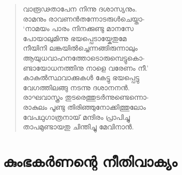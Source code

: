 \begin{verse}
വാരൂഢതാപേന നിന്നു ദശാസ്യനും.\\
രാമനും രാവണന്‍തന്നോടരുള്‍ചെയ്താ-\\
‘നാമയം പാരം നിനക്കുണ്ടു മാനസേ\\
പോയാലുമിന്നു ഭയപ്പെടായ്കേതുമേ\\
നീയിനി ലങ്കയില്‍ച്ചെന്നങ്ങിരുന്നാലും\\
ആയുധവാഹനത്തോടൊരുമ്പെട്ടുകൊ-\\
ണ്ടായോധനത്തിനു നാളെ വരേണം നീ.’\\
കാകുല്‍സ്ഥവാക്കുകള്‍ കേട്ടു ഭയപ്പെട്ടു\\
വേഗത്തിലങ്ങു നടന്നു ദശാനനന്‍.\\
രാഘവാസ്ത്രം തുടരെത്തുടര്‍ന്നുണ്ടെന്നൊ-\\
രാകുലം പൂണ്ടു തിരിഞ്ഞുനോക്കിത്തുലോം\\
വേപഥുഗാത്രനായ് മന്ദിരം പ്രാപിച്ചു\\
താപമുണ്ടായതു ചിന്തിച്ചു മേവിനാന്‍.
\end{verse}


\section{കുംഭകര്‍ണന്റെ നീതിവാക്യം}

